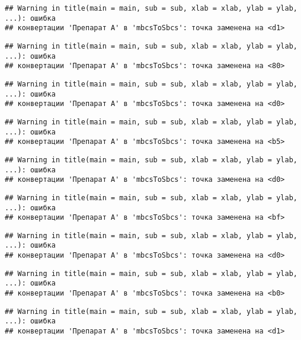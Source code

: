 \documentclass[
]{article}
\begin{document}
\begin{verbatim}
## Warning in title(main = main, sub = sub, xlab = xlab, ylab = ylab, ...): ошибка
## конвертации 'Препарат A' в 'mbcsToSbcs': точка заменена на <d1>
\end{verbatim}

\begin{verbatim}
## Warning in title(main = main, sub = sub, xlab = xlab, ylab = ylab, ...): ошибка
## конвертации 'Препарат A' в 'mbcsToSbcs': точка заменена на <80>
\end{verbatim}

\begin{verbatim}
## Warning in title(main = main, sub = sub, xlab = xlab, ylab = ylab, ...): ошибка
## конвертации 'Препарат A' в 'mbcsToSbcs': точка заменена на <d0>
\end{verbatim}

\begin{verbatim}
## Warning in title(main = main, sub = sub, xlab = xlab, ylab = ylab, ...): ошибка
## конвертации 'Препарат A' в 'mbcsToSbcs': точка заменена на <b5>
\end{verbatim}

\begin{verbatim}
## Warning in title(main = main, sub = sub, xlab = xlab, ylab = ylab, ...): ошибка
## конвертации 'Препарат A' в 'mbcsToSbcs': точка заменена на <d0>
\end{verbatim}

\begin{verbatim}
## Warning in title(main = main, sub = sub, xlab = xlab, ylab = ylab, ...): ошибка
## конвертации 'Препарат A' в 'mbcsToSbcs': точка заменена на <bf>
\end{verbatim}

\begin{verbatim}
## Warning in title(main = main, sub = sub, xlab = xlab, ylab = ylab, ...): ошибка
## конвертации 'Препарат A' в 'mbcsToSbcs': точка заменена на <d0>
\end{verbatim}

\begin{verbatim}
## Warning in title(main = main, sub = sub, xlab = xlab, ylab = ylab, ...): ошибка
## конвертации 'Препарат A' в 'mbcsToSbcs': точка заменена на <b0>
\end{verbatim}

\begin{verbatim}
## Warning in title(main = main, sub = sub, xlab = xlab, ylab = ylab, ...): ошибка
## конвертации 'Препарат A' в 'mbcsToSbcs': точка заменена на <d1>
\end{verbatim}
\end{document}
